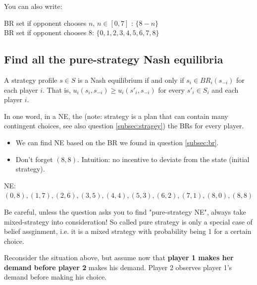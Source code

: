 \documentclass{article}
\begin{document}
\vspace{4mm}
You can also write: 
\vspace{4mm}

BR set if opponent chooses $n$, $n \in [0,7]$ : $\{8-n\}$ \\
BR set if opponent chooses $8$: $\{0,1,2,3,4,5,6,7,8\}$ \\



%
\subsection{Find all the pure-strategy Nash equilibria}

\begin{mdframed}[backgroundcolor=blue!20,linecolor=white]
A strategy profile $s \in S$ is a Nash equilibrium if and only if $s_i \in BR_i(s_{-i})$
for each player $i$. That is, $u_i (s_i , s_{-i}) \ge u_i (s'_i , s_{-i})$ for every  $s'_i \in S_i$
 and each player $i$.

\vspace{4mm}

In one word, in a NE, the (note: strategy is a plan that can contain many contingent choices, see also question \ref{subsec:stragey}) the BRs for every player. 

\begin{itemize}
\item We can find NE based on the BR we found in question \ref{subsec:br}. 
\item Don't forget $(8,8)$. Intuition: no incentive to deviate from the state (initial strategy).
\end{itemize}
\end{mdframed}

NE: $(0,8),(1,7),(2,6),(3,5),(4,4),(5,3),(6,2),(7,1),(8,0),(8,8)$
%


\begin{mdframed}[backgroundcolor=yellow!20,linecolor=white]
Be careful, unless the question asks you to find "pure-strategy NE", always take mixed-strategy into consideration! So called pure strategy is only a special case of belief assginment, i.e. it is a mixed strategy with probability being 1 for a certain choice.
\end{mdframed}



\large{Reconsider the situation above, but assume now that \textbf{player 1 makes her demand before
player 2} makes his demand. Player 2 observes player 1's demand before making his choice.}
\end{document}
